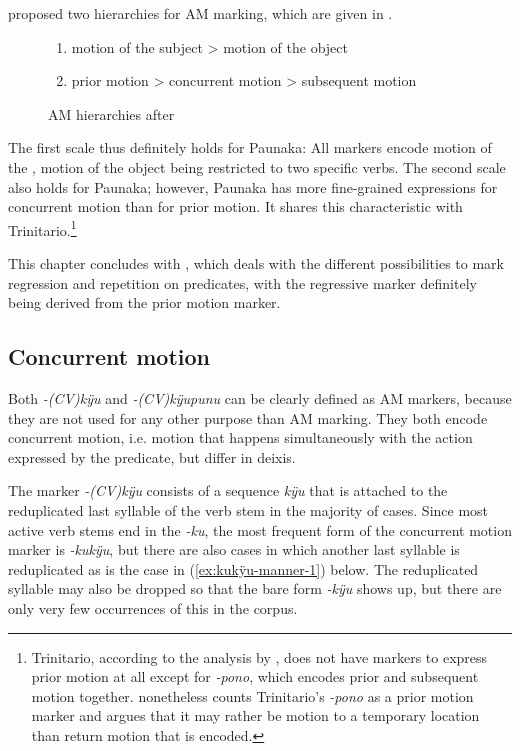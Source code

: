 \citet[83]{Guillaume2016} proposed two hierarchies for AM marking, which are given in .

\begin{figure}[!ht]
\centering
\begin{enumerate}
\item motion of the subject > motion of the object
\item prior motion > concurrent motion > subsequent motion
\end{enumerate}
\caption{AM hierarchies after \citet[83]{Guillaume2016}}
\label{fig:AMHierarchy}
\end{figure}

The first scale thus definitely holds for Paunaka: All markers encode motion of the , motion of the object being restricted to two specific verbs.
The second scale also holds for Paunaka; however, Paunaka has more fine-grained expressions for concurrent motion than for prior motion. It shares this characteristic with Trinitario.\footnote{Trinitario, according to the analysis by \citet[140]{Rose2015}, does not have markers to express prior motion at all except for \textit{-pono}, which encodes prior and subsequent motion together. \citet[108, 117--118]{Guillaume2016} nonetheless counts Trinitario’s \textit{-pono} as a prior motion marker and argues that it may rather be motion to a temporary location than return motion that is encoded.} 

This chapter concludes with , which deals with the different possibilities to mark regression and repetition on predicates, with the regressive marker definitely being derived from the prior motion marker.


\subsection{Concurrent motion}\label{sec:AMconcurrent}

Both \textit{-(CV)kÿu} and \textit{-(CV)kÿupunu} can be clearly defined as AM markers, because they are not used for any other purpose than AM marking. They both encode concurrent motion, i.e. motion that happens simultaneously with the action expressed by the predicate, but differ in deixis.

The marker \textit{-(CV)kÿu} consists of a sequence \textit{kÿu} that is attached to the reduplicated last syllable of the verb stem in the majority of cases. Since most active verb stems end in the  \textit{-ku}, the most frequent form of the concurrent motion marker is \textit{-kukÿu}, but there are also cases in which another last syllable is reduplicated as is the case in (\ref{ex:kukÿu-manner-1}) below. The reduplicated syllable may also be dropped so that the bare form \textit{-kÿu} shows up, but there are only very few occurrences of this in the corpus. %

